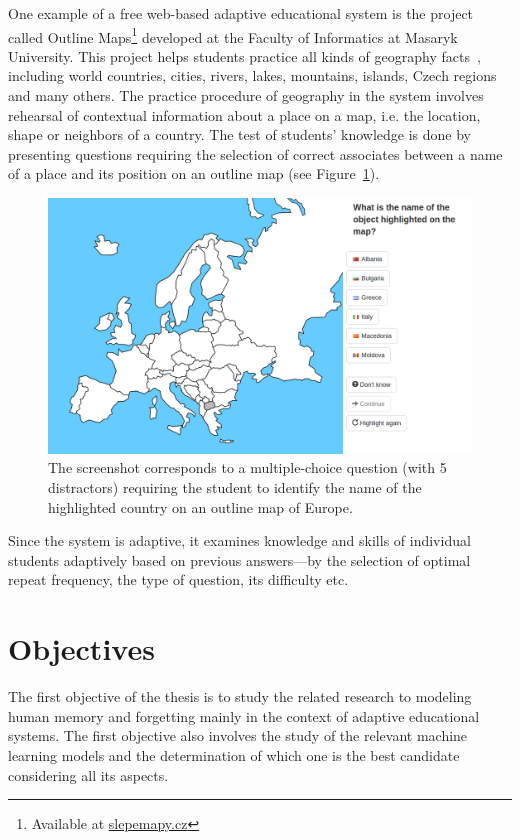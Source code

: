 One example of a free web-based adaptive educational system is the project called Outline Maps\footnote{Available at \url{slepemapy.cz}} developed at the Faculty of Informatics at Masaryk University. This project helps students practice all kinds of geography facts~\cite{Papousek2014}, including world countries, cities, rivers, lakes, mountains, islands, Czech regions and many others. The practice procedure of geography in the system involves rehearsal of contextual information about a place on a map, i.e. the location, shape or neighbors of a country. The test of students' knowledge is done by presenting questions requiring the selection of correct associates between a name of a place and its position on an outline map (see Figure~\ref{fig:slepemapy}).

\begin{figure}[htbp]
  \centering
  \includegraphics[width=\textwidth]{img/slepemapy}
  \caption{The screenshot corresponds to a multiple-choice question (with 5 distractors) requiring the student to identify the name of the highlighted country on an outline map of Europe.}
  \label{fig:slepemapy}
\end{figure}

Since the system is adaptive, it examines knowledge and skills of individual students adaptively based on previous answers---by the selection of optimal repeat frequency, the type of question, its difficulty etc.

\section{Objectives}

The first objective of the thesis is to study the related research to modeling human memory and forgetting mainly in the context of adaptive educational systems. The first objective also involves the study of the relevant machine learning models and the determination of which one is the best candidate considering all its aspects.

